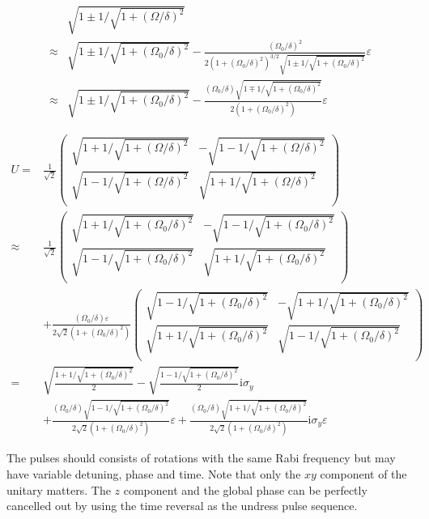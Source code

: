 \documentclass[10pt,fleqn]{article}
\newcommand{\ui}{\mathrm{i}}
\newcommand{\eqar}[1]
{
  \begin{align*}
    #1
  \end{align*}
}
\newcommand{\paren}[1]{{\left({#1}\right)}}
\begin{document}
\eqar{
  &\sqrt{1\pm1/\sqrt{1 + (\Omega/\delta)^2}}\\
  \approx&\sqrt{1\pm1/\sqrt{1 + (\Omega_0/\delta)^2}}-\frac{(\Omega_0/\delta)^2}{2\paren{1 + (\Omega_0/\delta)^2}^{3/2}\sqrt{1\pm1/\sqrt{1 + (\Omega_0/\delta)^2}}}\varepsilon\\
  \approx&\sqrt{1\pm1/\sqrt{1 + (\Omega_0/\delta)^2}}-\frac{(\Omega_0/\delta)\sqrt{1\mp1/\sqrt{1 + (\Omega_0/\delta)^2}}}{2\paren{1 + (\Omega_0/\delta)^2}}\varepsilon
}
\eqar{
  U=&\frac1{\sqrt2}\begin{pmatrix}
    \sqrt{1+1/\sqrt{1 + (\Omega/\delta)^2}}&-\sqrt{1-1/\sqrt{1 + (\Omega/\delta)^2}}\\
    \sqrt{1-1/\sqrt{1 + (\Omega/\delta)^2}}&\sqrt{1+1/\sqrt{1 + (\Omega/\delta)^2}}\\
  \end{pmatrix}\\
  \approx&\frac1{\sqrt2}\begin{pmatrix}
    \sqrt{1+1/\sqrt{1 + (\Omega_0/\delta)^2}}&-\sqrt{1-1/\sqrt{1 + (\Omega_0/\delta)^2}}\\
    \sqrt{1-1/\sqrt{1 + (\Omega_0/\delta)^2}}&\sqrt{1+1/\sqrt{1 + (\Omega_0/\delta)^2}}\\
  \end{pmatrix}\\
  &+\frac{(\Omega_0/\delta)\varepsilon}{2\sqrt2\paren{1 + (\Omega_0/\delta)^2}}\begin{pmatrix}
    \sqrt{1-1/\sqrt{1 + (\Omega_0/\delta)^2}}&-\sqrt{1+1/\sqrt{1 + (\Omega_0/\delta)^2}}\\
    \sqrt{1+1/\sqrt{1 + (\Omega_0/\delta)^2}}&\sqrt{1-1/\sqrt{1 + (\Omega_0/\delta)^2}}\\
  \end{pmatrix}\\
  =&\sqrt{\frac{1+1/\sqrt{1 + (\Omega_0/\delta)^2}}{2}}-
  \sqrt{\frac{1-1/\sqrt{1 + (\Omega_0/\delta)^2}}{2}}\ui\sigma_y\\
  &+\frac{(\Omega_0/\delta)\sqrt{1-1/\sqrt{1 + (\Omega_0/\delta)^2}}}{2\sqrt2\paren{1 + (\Omega_0/\delta)^2}}\varepsilon
  +\frac{(\Omega_0/\delta)\sqrt{1+1/\sqrt{1 + (\Omega_0/\delta)^2}}}{2\sqrt2\paren{1 + (\Omega_0/\delta)^2}}\ui\sigma_y\varepsilon
}

The pulses should consists of rotations with the same Rabi frequency
but may have variable detuning, phase and time. Note that only the $xy$ component
of the unitary matters. The $z$ component and the global phase can be perfectly
cancelled out by using the time reversal as the undress pulse sequence.
\end{document}
